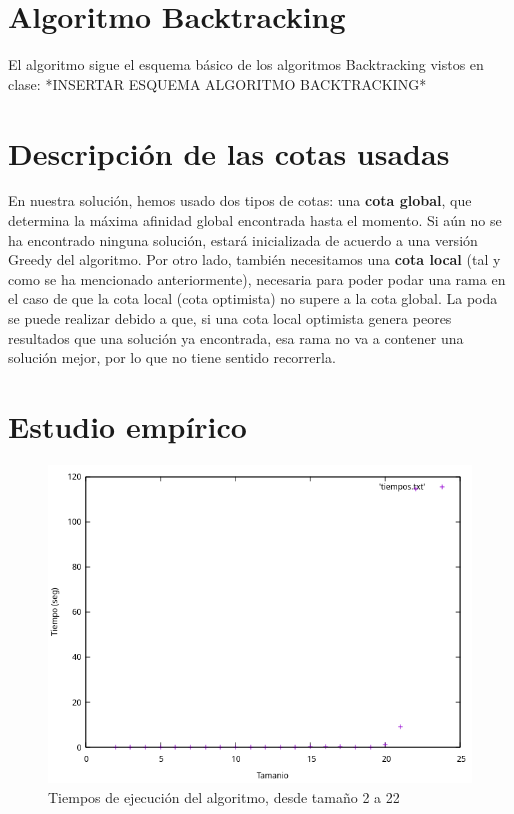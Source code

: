 \documentclass{article}
\begin{document}
	\section{Algoritmo Backtracking}
	El algoritmo sigue el esquema básico de los algoritmos Backtracking vistos en clase: *INSERTAR ESQUEMA ALGORITMO BACKTRACKING*
	
	\section{Descripción de las cotas usadas}
	En nuestra solución, hemos usado dos tipos de cotas: una \textbf{cota global}, que determina la máxima afinidad global encontrada hasta el momento. Si aún no se ha encontrado ninguna solución, estará inicializada de acuerdo a una versión Greedy del algoritmo. Por otro lado, también necesitamos una \textbf{cota local} (tal y como se ha mencionado anteriormente), necesaria para poder podar una rama en el caso de que la cota local (cota optimista) no supere a la cota global. La poda se puede realizar debido a que, si una cota local optimista genera peores resultados que una solución ya encontrada, esa rama no va a contener una solución mejor, por lo que no tiene sentido recorrerla.
	
	\section{Estudio empírico}
	\begin{figure}[H]
		\centering
		\includegraphics[totalheight=7cm]{grafica1}
		\caption{Tiempos de ejecución del algoritmo, desde tamaño 2 a 22}
		\label{fig:eficiencia_empirica}
	\end{figure}
\end{document}
